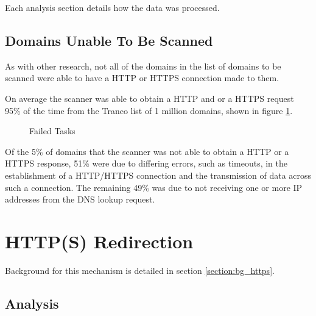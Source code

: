 \documentclass{mscreport}
\begin{document}
\vspace{0.3cm} \noindent
Each analysis section details how the data was processed.


\subsection{Domains Unable To Be Scanned}

As with other research, not all of the domains in the list of domains to be scanned were able to have a HTTP or HTTPS connection made to them.

\vspace{0.3cm} \noindent
On average the scanner was able to obtain a HTTP and or a HTTPS request 95\% of the time from the Tranco list of 1 million domains, shown in figure \ref{fig:failed_tasks}.

\begin{figure}[H]
	\begin{center}
		\caption{Failed Tasks}
		\label{fig:failed_tasks}
	\end{center}
\end{figure}

\noindent
Of the 5\% of domains that the scanner was not able to obtain a HTTP or a HTTPS response, 51\% were due to differing errors, such as timeouts, in the establishment of a HTTP/HTTPS connection and the transmission of data across such a connection. The remaining 49\% was due to not receiving one or more IP addresses from the DNS lookup request.


\clearpage 

\newpage

\section{HTTP(S) Redirection}
\label{section:ana_https_rdr}

Background for this mechanism is detailed in section \ref{section:bg_https}.

\subsection{Analysis}
\end{document}
